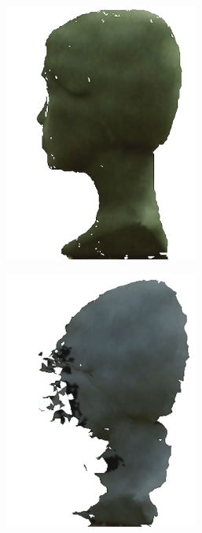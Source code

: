 \begin{figure}[h]
	\centering
	\begin{subfigure}[b]{0.24\textwidth}
		\centering
		\includegraphics[width=0.7\textwidth]{figures/3dmodels-c.png}
		\caption{}
		\label{fig:3dm:b}
	\end{subfigure}
	\hfill
	\begin{subfigure}[b]{0.24\textwidth}
		\centering
		\includegraphics[width=0.7\textwidth]{figures/3dmodels-a.png}

\end{subfigure}
\end{figure}

